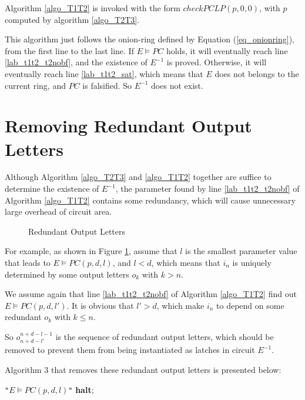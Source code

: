 \documentclass[journal]{IEEEtran}
\begin{document}
Algorithm \ref{algo_T1T2} is invoked with the form $checkPCLP(p,0,0)$,
with $p$ computed by algorithm \ref{algo_T2T3}.

This algorithm just follows the onion-ring defined by Equation (\ref{eq_onionring}),
from the first line to the last line.
If $E\vDash PC$ holds,
it will eventually reach line \ref{lab_t1t2_t2nobf},
and the existence of $E^{-1}$ is proved.
Otherwise,
it will eventually reach line \ref{lab_t1t2_sat},
which means that $E$ does not belongs to the current ring,
and $PC$ is falsified.
So $E^{-1}$ does not exist.

\section{Removing Redundant Output Letters}\label{sec_rmred}
Although Algorithm \ref{algo_T2T3} and \ref{algo_T1T2} together are suffice to determine the existence of $E^{-1}$,
the parameter found by line \ref{lab_t1t2_t2nobf} of Algorithm \ref{algo_T1T2} contains some redundancy,
which will cause unnecessary large overhead of circuit area.

\begin{figure}[t]
\begin{center}
\end{center}
\caption{Redundant Output Letters}
  \label{fig_rmred}
\end{figure}

For example,
as shown in Figure \ref{fig_rmred},
assume that $l$ is the smallest parameter value that leads to $E\vDash PC(p,d,l)$,
and $l<d$,
which means that $i_n$ is uniquely determined by some output letters $o_k$ with $k>n$.

We assume again that line \ref{lab_t1t2_t2nobf} of Algorithm \ref{algo_T1T2} find out $E\vDash PC(p,d,l')$.
It is obvious that $l'>d$,
which make $i_n$ to depend on some redundant $o_k$ with $k\le n$.

So $o_{n+d-l'}^{n+d-l-1}$ is the sequence of redundant output letters,
which should be removed to prevent them from being instantiated as latches in circuit $E^{-1}$.

Algorithm 3 that removes these redundant output letters is presented below:

\begin{algorithm}
\caption{$RemoveRedundancy(p,d,l')$}
\label{algo_remove}
\begin{algorithmic}[1]
\PRINT \texttt{"$E\vDash PC(p,d,l)$"}
\STATE \textbf{halt};
\ENDIF
\ENDFOR
\end{algorithmic}
\end{algorithm}
\end{document}
